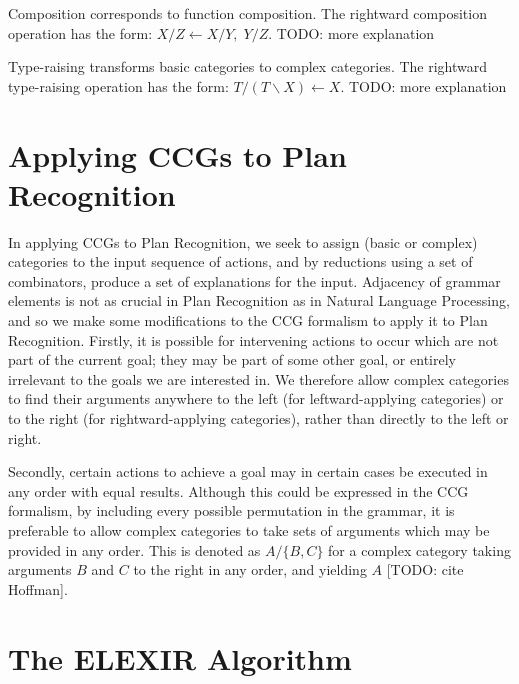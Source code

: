 Composition corresponds to function composition. The rightward composition operation has the form: $X/Z \leftarrow X/Y,\;  Y/Z$. TODO: more explanation

Type-raising transforms basic categories to complex categories. The rightward type-raising operation has the form: $T/(T\backslash X) \leftarrow X$. TODO: more explanation

\section{Applying CCGs to Plan Recognition}

In applying CCGs to Plan Recognition, we seek to assign (basic or complex) categories to the input sequence of actions, and by reductions using a set of combinators, produce a set of explanations for the input. Adjacency of grammar elements is not as crucial in Plan Recognition as in Natural Language Processing, and so we make some modifications to the CCG formalism to apply it to Plan Recognition.
Firstly, it is possible for intervening actions to occur which are not part of the current goal; they may be part of some other goal, or entirely irrelevant to the goals we are interested in. We therefore allow complex categories to find their arguments anywhere to the left (for leftward-applying categories) or to the right (for rightward-applying categories), rather than directly to the left or right.

Secondly, certain actions to achieve a goal may in certain cases be executed in any order with equal results. Although this could be expressed in the CCG formalism, by including every possible permutation in the grammar, it is preferable to allow complex categories to take sets of arguments which may be provided in any order. This is denoted as $A/\{B, C\}$ for a complex category taking arguments $B$ and $C$ to the right in any order, and yielding $A$ [TODO: cite Hoffman].

\section{The ELEXIR Algorithm}

